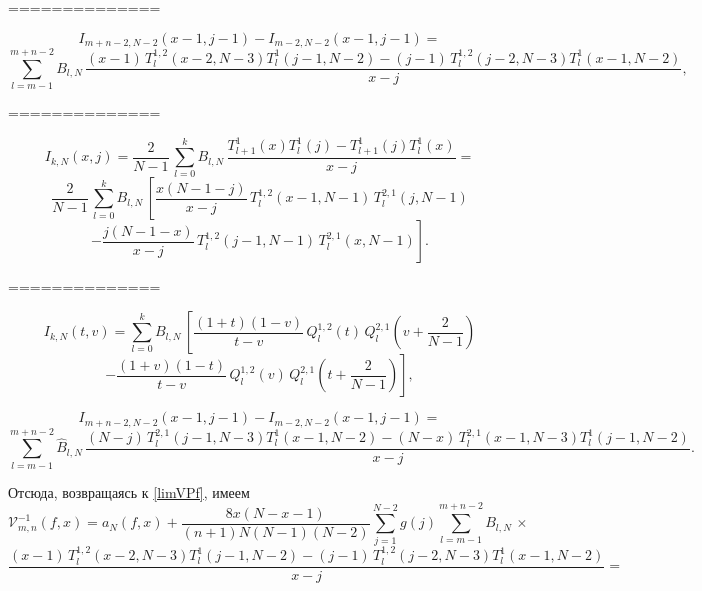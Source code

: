\documentclass[12pt]{book}
\begin{document}
==============

\begin{equation*}
  I_{m+n-2,N-2}(x-1,j-1) - I_{m-2,N-2}(x-1,j-1) =
\end{equation*}
\begin{equation*}
\sum_{l=m-1}^{m+n-2}
  B_{l,N}\,
  \frac{(x-1)\,T^{1,2}_{l}(x-2,N-3) T_{l}^1(j-1,N-2) - (j-1)\,T^{1,2}_{l}(j-2,N-3) T_{l}^1(x-1,N-2)}{x-j},
\end{equation*}

==============

\begin{equation*}
  I_{k,N}(x,j) = \frac{2}{N-1}\,
  \sum_{l=0}^{k} B_{l,N}\,
  \frac{T_{l+1}^1(x) T_{l}^1(j) - T_{l+1}^1(j) T_{l}^1(x)}{x-j} =
\end{equation*}
\begin{equation*}
  \frac{2}{N-1}\,\sum_{l=0}^{k} B_{l,N}\, \left[
    \frac{x(N-1-j)}{x-j}\,T^{1,2}_{l}(x-1,N-1)\,T^{2,1}_{l}(j,N-1)
  \right.
\end{equation*}
\begin{equation*}
\left.
  - \frac{j(N-1-x)}{x-j}\,T^{1,2}_{l}(j-1,N-1)\,T^{2,1}_{l}(x,N-1)
\right].
\end{equation*}





==============

\begin{equation*}
  I_{k,N}(t,v) =
  \sum_{l=0}^{k} B_{l,N} \,
  \left[
    \frac{(1+t)(1-v)}{t-v}\,Q^{1,2}_{l}(t)\,Q^{2,1}_{l}\left(v+\frac{2}{N-1}\right)
  \right.
\end{equation*}
\begin{equation*}
\left.
  - \frac{(1+v)(1-t)}{t-v}\,Q^{1,2}_{l}(v)\,Q^{2,1}_{l}\left(t+\frac{2}{N-1}\right)
\right],
\end{equation*}

\begin{equation*}
  I_{m+n-2,N-2}(x-1,j-1) - I_{m-2,N-2}(x-1,j-1) =
\end{equation*}
\begin{equation*}
\sum_{l=m-1}^{m+n-2}
  \hat{B}_{l,N}\,
  \frac{(N-j)\,T^{2,1}_{l}(j-1,N-3) T_{l}^1(x-1,N-2)
    - (N-x)\,T^{2,1}_{l}(x-1,N-3) T_{l}^1(j-1,N-2)}{x-j}.
\end{equation*}


Отсюда, возвращаясь к \eqref{limVPf}, имеем
\begin{equation*}
  \mathcal{V}^{-1}_{m,n}(f,x) = a_N(f,x) +
   \frac{8x(N-x-1)}{(n+1)N(N-1)(N-2)}
   \sum_{j=1}^{N-2} g(j) \sum_{l=m-1}^{m+n-2}
  B_{l,N}\,\times
\end{equation*}
\begin{equation*}
  \frac{(x-1)\,T^{1,2}_{l}(x-2,N-3) T_{l}^1(j-1,N-2) - (j-1)\,T^{1,2}_{l}(j-2,N-3) T_{l}^1(x-1,N-2)}{x-j} =
\end{equation*}
\end{document}
